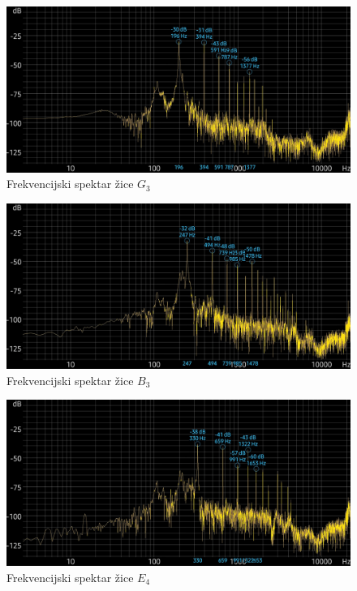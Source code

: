 \documentclass[times, utf8, diplomski, numeric]{fer}
\begin{document}
\begin{figure}
	\centerline{\includegraphics[width=1\textwidth]{spektrogram_g3.jpg}}
	\caption{Frekvencijski spektar žice $G_3$}
	\label{fig}
\end{figure}
\begin{figure}
	\centerline{\includegraphics[width=1\textwidth]{spektrogram_b3.jpg}}
	\caption{Frekvencijski spektar žice $B_3$}
	\label{fig}
\end{figure}
\begin{figure}
	\centerline{\includegraphics[width=1\textwidth]{spektrogram_e4.jpg}}
	\caption{Frekvencijski spektar žice $E_4$}
	\label{fig}
\end{figure}
\end{document}
